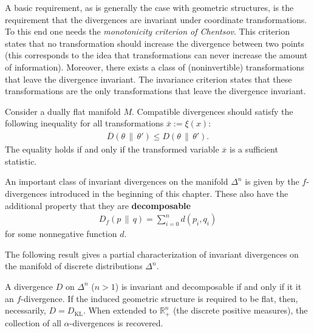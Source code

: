     A basic requirement, as is generally the case with geometric structures, is the requirement that the divergences are invariant under coordinate transformations. To this end one needs the \textit{monotonicity criterion of Chentsov}. This criterion states that no transformation should increase the divergence between two points (this corresponds to the idea that transformations can never increase the amount of information). Moreover, there exists a class of (noninvertible) transformations that leave the divergence invariant.
    The invariance criterion states that these transformations are the only transformations that leave the divergence invariant.
    \begin{axiom}
        Consider a dually flat manifold $M$. Compatible divergences should satisfy the following inequality for all transformations $\overline{x}:=\xi(x)$:
        \begin{gather}
            \overline{D}(\theta\,\|\,\theta')\leq D(\theta\,\|\,\theta').
        \end{gather}
        The equality holds if and only if the transformed variable $\overline{x}$ is a sufficient statistic.
    \end{axiom}

    \begin{example}[$f$-divergences]
        An important class of invariant divergences on the manifold $\Delta^n$ is given by the $f$-divergences introduced in the beginning of this chapter. These also have the additional property that they are \textbf{decomposable}
        \begin{gather}
            D_f(p\,\|\,q) = \sum_{i=0}^n d(p_i, q_i)
        \end{gather}
        for some nonnegative function $d$.
    \end{example}

    The following result gives a partial characterization of invariant divergences on the manifold of discrete distributions $\Delta^n$.
    \begin{property}
        A divergence $D$ on $\Delta^n$ ($n>1$) is invariant and decomposable if and only if it it an $f$-divergence. If the induced geometric structure is required to be flat, then, necessarily, $D=D_{\text{KL}}$. When extended to $\mathbb{R}^n_+$ (the discrete positive measures), the collection of all $\alpha$-divergences is recovered.
    \end{property}


